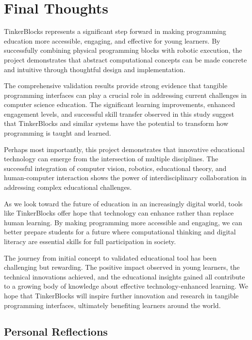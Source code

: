 \section{Final Thoughts}

TinkerBlocks represents a significant step forward in making programming education more accessible, engaging, and effective for young learners. By successfully combining physical programming blocks with robotic execution, the project demonstrates that abstract computational concepts can be made concrete and intuitive through thoughtful design and implementation.

The comprehensive validation results provide strong evidence that tangible programming interfaces can play a crucial role in addressing current challenges in computer science education. The significant learning improvements, enhanced engagement levels, and successful skill transfer observed in this study suggest that TinkerBlocks and similar systems have the potential to transform how programming is taught and learned.

Perhaps most importantly, this project demonstrates that innovative educational technology can emerge from the intersection of multiple disciplines. The successful integration of computer vision, robotics, educational theory, and human-computer interaction shows the power of interdisciplinary collaboration in addressing complex educational challenges.

As we look toward the future of education in an increasingly digital world, tools like TinkerBlocks offer hope that technology can enhance rather than replace human learning. By making programming more accessible and engaging, we can better prepare students for a future where computational thinking and digital literacy are essential skills for full participation in society.

The journey from initial concept to validated educational tool has been challenging but rewarding. The positive impact observed in young learners, the technical innovations achieved, and the educational insights gained all contribute to a growing body of knowledge about effective technology-enhanced learning. We hope that TinkerBlocks will inspire further innovation and research in tangible programming interfaces, ultimately benefiting learners around the world.

\subsection{Personal Reflections}

